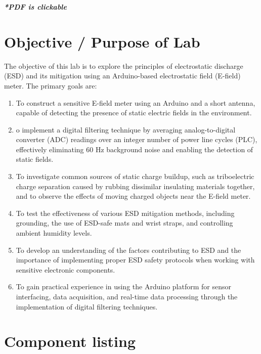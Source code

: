 \documentclass[a4paper,11pt]{article}%
\begin{document}


\pagebreak

\tableofcontents
\listoffigures
\listoftables
\vfill
\begin{center}
  \textbf{\textit{*PDF is clickable}}
\end{center}

\pagebreak

\section{Objective / Purpose of Lab}

The objective of this lab is to explore the principles of electrostatic discharge (ESD) and its mitigation using an Arduino-based electrostatic field (E-field) meter. The primary goals are:
\begin{enumerate}
  \item To construct a sensitive E-field meter using an Arduino and a short antenna, capable of detecting the presence of static electric fields in the environment.
  \item o implement a digital filtering technique by averaging analog-to-digital converter (ADC) readings over an integer number of power line cycles (PLC), effectively eliminating 60 Hz background noise and enabling the detection of static fields.
  \item To investigate common sources of static charge buildup, such as triboelectric charge separation caused by rubbing dissimilar insulating materials together, and to observe the effects of moving charged objects near the E-field meter.
  \item To test the effectiveness of various ESD mitigation methods, including grounding, the use of ESD-safe mats and wrist straps, and controlling ambient humidity levels.
  \item  To develop an understanding of the factors contributing to ESD and the importance of implementing proper ESD safety protocols when working with sensitive electronic components.
  \item To gain practical experience in using the Arduino platform for sensor interfacing, data acquisition, and real-time data processing through the implementation of digital filtering techniques.
\end{enumerate}



\section{Component listing}
\end{document}

